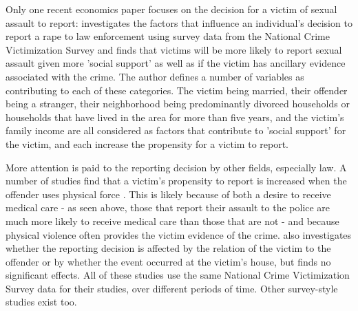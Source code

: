\documentclass[AER,draftmode]{AEA}
\begin{document}
Only one recent economics paper focuses on the decision for a victim of sexual assault to report:  investigates the factors that influence an individual's decision to report a rape to law enforcement using survey data from the National Crime Victimization Survey and finds that victims will be more likely to report sexual assault given more 'social support' as well as if the victim has ancillary evidence associated with the crime. The author defines a number of variables as contributing to each of these categories. The victim being married, their offender being a stranger, their neighborhood being predominantly divorced households or households that have lived in the area for more than five years, and the victim's family income are all considered as factors that contribute to 'social support' for the victim, and each increase the propensity for a victim to report.

More attention is paid to the reporting decision by other fields, especially law. A number of studies find that a victim's propensity to report is increased when the offender uses physical force \cite{bachman_predicting_1993,du_mont_role_2003}. This is likely because of both a desire to receive medical care - as seen above, those that report their assault to the police are much more likely to receive medical care than those that are not - and because physical violence often provides the victim evidence of the crime.  also investigates whether the reporting decision is affected by the relation of the victim to the offender or by whether the event occurred at the victim's house, but finds no significant effects. All of these studies use the same National Crime Victimization Survey data for their studies, over different periods of time. Other survey-style studies exist too. 
\end{document}
